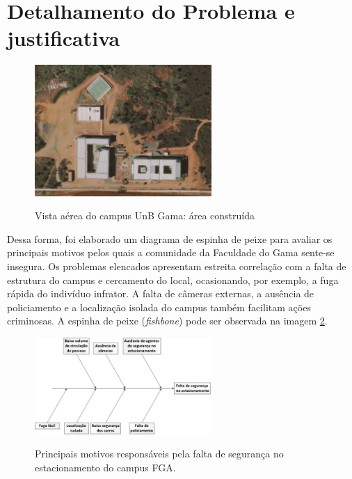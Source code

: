 \section{Detalhamento do Problema e justificativa} 
\label{sec:detalhamentoProblema}

\begin{figure}[H]
	\centering
	\caption[Vista aérea do campus UnB Gama: área construída]{Vista aérea do campus UnB Gama: área construída~\cite{mapa1}}
	\includegraphics[width=0.6\textwidth]{figuras/fga1}
	\label{img:fga1}
\end{figure}

Dessa forma, foi elaborado um diagrama de espinha de peixe para avaliar os principais motivos pelos quais a comunidade da Faculdade do Gama sente-se insegura. Os problemas elencados apresentam estreita correlação com a falta de estrutura do campus e cercamento do local, ocasionando, por exemplo, a fuga rápida do indivíduo infrator. A falta de câmeras externas, a ausência de policiamento e a localização isolada do campus também facilitam ações criminosas. A espinha de peixe (\textit{fishbone}) pode ser observada na imagem \ref{img:fishbone}.

\begin{figure}[htp]
	\centering
	\caption{Principais motivos responsáveis pela falta de segurança no estacionamento do campus FGA.}
	\includegraphics[width=0.6\textwidth]{figuras/fishbone}
	\label{img:fishbone}
\end{figure}

